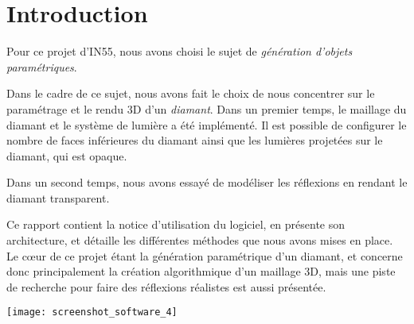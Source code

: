 \section{Introduction}

Pour ce projet d'IN55, nous avons choisi le sujet de \emph{génération
d'objets paramétriques}.

Dans le cadre de ce sujet, nous avons fait le choix de nous concentrer sur le paramétrage
et le rendu 3D d'un \emph{diamant}.
Dans un premier temps, le maillage du diamant et le système de lumière a été implémenté.
Il est possible de configurer le nombre de faces inférieures du diamant ainsi que
les lumières projetées sur le diamant, qui est opaque.

Dans un second temps, nous avons essayé de modéliser les réflexions en rendant le diamant
transparent.

Ce rapport contient la notice d'utilisation du logiciel, en présente son architecture,
et détaille les différentes méthodes que nous avons mises en place.
Le cœur de ce projet étant la génération paramétrique d'un diamant, et concerne
donc principalement la création algorithmique d'un maillage 3D, mais une piste de
recherche pour faire des réflexions réalistes est aussi présentée.

{\centering \texttt{[image: screenshot\_software\_4]}}

